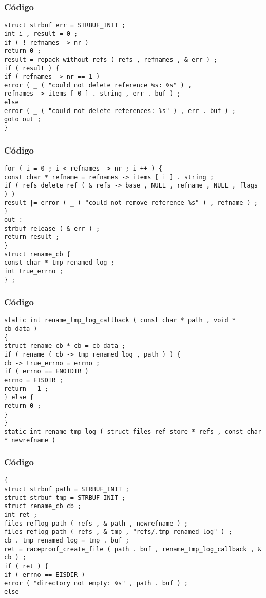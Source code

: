\documentclass{beamer}
\begin{document}
\begin{frame}[fragile]
\frametitle{C\'odigo}
\begin{verbatim}
struct strbuf err = STRBUF_INIT ; 
int i , result = 0 ; 
if ( ! refnames -> nr ) 
return 0 ; 
result = repack_without_refs ( refs , refnames , & err ) ; 
if ( result ) { 
if ( refnames -> nr == 1 ) 
error ( _ ( "could not delete reference %s: %s" ) , 
refnames -> items [ 0 ] . string , err . buf ) ; 
else 
error ( _ ( "could not delete references: %s" ) , err . buf ) ; 
goto out ; 
} 
\end{verbatim}
\end{frame}
\begin{frame}[fragile]
\frametitle{C\'odigo}
\begin{verbatim}
for ( i = 0 ; i < refnames -> nr ; i ++ ) { 
const char * refname = refnames -> items [ i ] . string ; 
if ( refs_delete_ref ( & refs -> base , NULL , refname , NULL , flags ) ) 
result |= error ( _ ( "could not remove reference %s" ) , refname ) ; 
} 
out : 
strbuf_release ( & err ) ; 
return result ; 
} 
struct rename_cb { 
const char * tmp_renamed_log ; 
int true_errno ; 
} ; 
\end{verbatim}
\end{frame}
\begin{frame}[fragile]
\frametitle{C\'odigo}
\begin{verbatim}
static int rename_tmp_log_callback ( const char * path , void * cb_data ) 
{ 
struct rename_cb * cb = cb_data ; 
if ( rename ( cb -> tmp_renamed_log , path ) ) { 
cb -> true_errno = errno ; 
if ( errno == ENOTDIR ) 
errno = EISDIR ; 
return - 1 ; 
} else { 
return 0 ; 
} 
} 
static int rename_tmp_log ( struct files_ref_store * refs , const char * newrefname ) 
\end{verbatim}
\end{frame}
\begin{frame}[fragile]
\frametitle{C\'odigo}
\begin{verbatim}
{ 
struct strbuf path = STRBUF_INIT ; 
struct strbuf tmp = STRBUF_INIT ; 
struct rename_cb cb ; 
int ret ; 
files_reflog_path ( refs , & path , newrefname ) ; 
files_reflog_path ( refs , & tmp , "refs/.tmp-renamed-log" ) ; 
cb . tmp_renamed_log = tmp . buf ; 
ret = raceproof_create_file ( path . buf , rename_tmp_log_callback , & cb ) ; 
if ( ret ) { 
if ( errno == EISDIR ) 
error ( "directory not empty: %s" , path . buf ) ; 
else 
\end{verbatim}
\end{frame}
\end{document}
